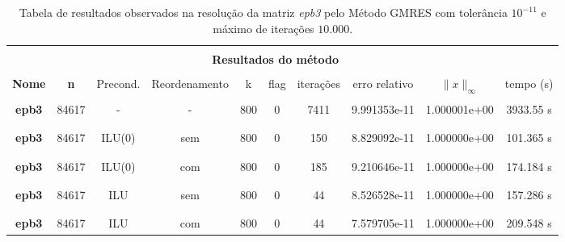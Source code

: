 \begin{table}[ht]
    \centering
    \begin{tabular}{|c|c|c|c|c|c|c|c|c|c|}
        \hline \rowcolor{Gray}
        \multicolumn{10}{|c|}{\bfseries Tabela do Método GMRES com tolerância $10^{-11}$ e máximo de iterações $10.000$ }\\
        \hline \rowcolor{Gray}  \multicolumn{2}{|c|}{} & \multicolumn{8}{|c|}{} \\
         [-1em]  \rowcolor{Gray}
         \multicolumn{2}{|c|}{\bfseries Informações da matriz } & \multicolumn{8}{|c|}{\bfseries Resultados do método }\\
         \hline \rowcolor{Gray} & & & & & & & & & \\
         [-1em]
         \rowcolor{Gray}
         \bfseries Nome & \bfseries n & Precond. & Reordenamento & k & flag & iterações &
         erro relativo &
         $\|x\|_\infty$  & tempo (s) \\
         \hline & & & & & & & & & \\
         [-1em] \bfseries epb3 & 84617 & - & - & 800 & 0 & 7411 & 9.991353e-11 & 1.000001e+00 & 3933.55 s \\ & & & & & & & & \\ [-1em] \hline \\
         [-1em] \bfseries epb3 & 84617 & ILU(0) & sem & 800 & 0 & 150 & 8.829092e-11 & 1.000000e+00 & 101.365 s \\ & & & & & & & & \\ [-1em] \hline \\
         [-1em] \bfseries epb3 & 84617 & ILU(0) & com & 800 & 0 & 185 & 9.210646e-11 & 1.000000e+00 & 174.184 s \\ & & & & & & & & \\ [-1em] \hline \\
         [-1em] \bfseries epb3 & 84617 & ILU & sem & 800 & 0 & 44 & 8.526528e-11 & 1.000000e+00 & 157.286 s \\ & & & & & & & & \\ [-1em] \hline \\
         [-1em] \bfseries epb3 & 84617 & ILU & com & 800 & 0 & 44 & 7.579705e-11 & 1.000000e+00 & 209.548 s \\ \hline
    \end{tabular}
    \caption{Tabela de resultados observados na resolução da matriz \textit{epb3} pelo Método GMRES com tolerância $10^{-11}$ e máximo de iterações $10.000$.}
    \label{tab:resultados-epb}
\end{table}